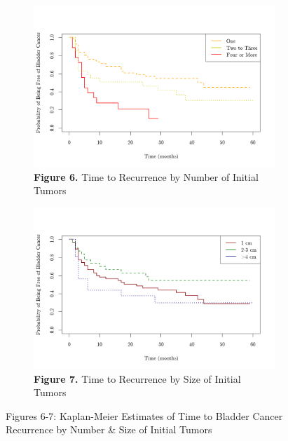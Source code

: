 \documentclass{article}
\begin{document}
	\begin{figure}[htbp]
		\centering
		\captionsetup{labelformat=empty} %
		\begin{subfigure}[t]{0.48\textwidth}
		  \centering
		  \includegraphics[width=\linewidth]{graphs/case1/recurrance~tumor_count.png}
		  \caption{\textbf{Figure 6.} Time to Recurrence by Number of Initial Tumors}
		  \label{surv-tumor-count}
		\end{subfigure}
		\hfill
		\begin{subfigure}[t]{0.48\textwidth}
		  \centering
		  \includegraphics[width=\linewidth]{graphs/case1/recurrance~tumor_size.png}
		  \caption{\textbf{Figure 7.} Time to Recurrence by Size of Initial Tumors}
		  \label{surv-tumor-size}
		\end{subfigure}
		\caption{Figures 6-7: Kaplan-Meier Estimates of Time to Bladder Cancer Recurrence by Number \& Size of Initial Tumors}
	\end{figure}
	\addtocounter{figure}{1}
\end{document}
